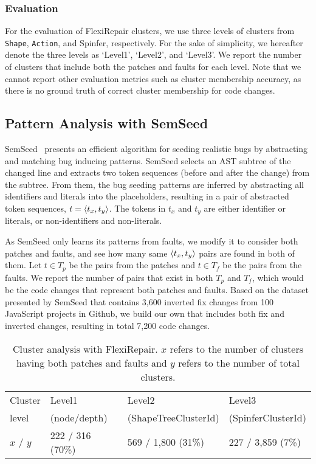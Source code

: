 \documentclass[conference]{IEEEtran}
\begin{document}
\subsubsection{Evaluation} 
For the evaluation of FlexiRepair clusters, we use three levels of clusters from
\texttt{Shape}, \texttt{Action}, and Spinfer, respectively. For the sake of simplicity, we
hereafter denote the three levels as `Level1', `Level2', and `Level3'. We report
the number of clusters that include both the patches and faults for each level.
Note that we cannot report other evaluation metrics such as cluster membership
accuracy, as there is no ground truth of correct cluster membership for code
changes.


\subsection{Pattern Analysis with SemSeed}
\label{sec:RQ1_semseed}

SemSeed~\cite{patra2021semantic} presents an efficient algorithm for seeding
realistic bugs by abstracting and matching bug inducing patterns.
SemSeed selects an AST subtree of the
changed line and extracts two token sequences (before and after the change) from
the subtree. From them, the bug seeding patterns are inferred by abstracting all
identifiers and literals into the placeholders, resulting in a pair of
abstracted token sequences, $t = \braket{t_{x}, t_{y}}$. The tokens in $t_{x}$
and $t_{y}$ are either identifier or literals, or non-identifiers and
non-literals.

As SemSeed only learns its patterns from faults, we modify it to consider both
patches and faults, and see how many same $\braket{t_{x}, t_{y}}$ pairs are
found in both of them. Let $t \in T_{p}$ be the pairs from the patches and $t
\in T_{f}$ be the pairs from the faults. We report the number of pairs that
exist in both $T_{p}$ and $T_{f}$, which would be the code changes that
represent both patches and faults. Based on the dataset presented by SemSeed
that contains 3,600 inverted fix changes from 100 JavaScript projects in
Github, we build our own that includes both fix and inverted changes, resulting in total 7,200 code
changes. 

\begin{table}[!ht]
    \centering
    \caption{Cluster analysis with FlexiRepair. $x$ refers to the number
        of clusters having both patches and faults and $y$ refers to the
        number of total clusters.}
    \label{tab:RQ1}
    \begin{tabular}{l|lll}
        \toprule
        Cluster  & Level1           & Level2               & Level3             \\
             level       & (node/depth)     & (ShapeTreeClusterId) & (SpinferClusterId) \\
        \midrule
        $x$ / $y$     & 222 / 316 (70\%) & 569 / 1,800 (31\%)   & 227 / 3,859 (7\%)  \\
        \bottomrule
    \end{tabular}
\end{table}
\end{document}
